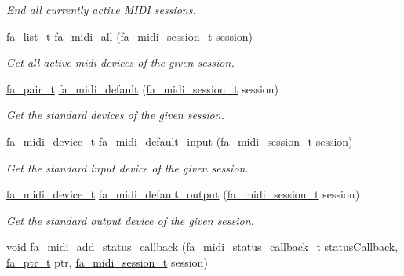 \begin{DoxyCompactItemize}
\begin{DoxyCompactList}\small\item\em End all currently active M\-I\-D\-I sessions. \end{DoxyCompactList}\item 
\hyperlink{group___fa_list_ga35ecb12ab934ded0cce0bcf28e3bc5d2}{fa\-\_\-list\-\_\-t} \hyperlink{group___fa_midi_gafbb8556093f979db2a0b3483e40c6da3}{fa\-\_\-midi\-\_\-all} (\hyperlink{group___fa_midi_ga222964548b932c6f53b575b23629530e}{fa\-\_\-midi\-\_\-session\-\_\-t} session)
\begin{DoxyCompactList}\small\item\em Get all active midi devices of the given session. \end{DoxyCompactList}\item 
\hyperlink{group___fa_pair_gac2b2e58c230bac4f8a63ef6c05072680}{fa\-\_\-pair\-\_\-t} \hyperlink{group___fa_midi_gab20056f966f2be60bd4be8279b74c893}{fa\-\_\-midi\-\_\-default} (\hyperlink{group___fa_midi_ga222964548b932c6f53b575b23629530e}{fa\-\_\-midi\-\_\-session\-\_\-t} session)
\begin{DoxyCompactList}\small\item\em Get the standard devices of the given session. \end{DoxyCompactList}\item 
\hyperlink{group___fa_midi_gabbbfd1ec30a186768ba2744e46bacc9b}{fa\-\_\-midi\-\_\-device\-\_\-t} \hyperlink{group___fa_midi_ga4e47ae817979dbce0da298466e97da75}{fa\-\_\-midi\-\_\-default\-\_\-input} (\hyperlink{group___fa_midi_ga222964548b932c6f53b575b23629530e}{fa\-\_\-midi\-\_\-session\-\_\-t} session)
\begin{DoxyCompactList}\small\item\em Get the standard input device of the given session. \end{DoxyCompactList}\item 
\hyperlink{group___fa_midi_gabbbfd1ec30a186768ba2744e46bacc9b}{fa\-\_\-midi\-\_\-device\-\_\-t} \hyperlink{group___fa_midi_gad859725831a5227e58a53e867af798b3}{fa\-\_\-midi\-\_\-default\-\_\-output} (\hyperlink{group___fa_midi_ga222964548b932c6f53b575b23629530e}{fa\-\_\-midi\-\_\-session\-\_\-t} session)
\begin{DoxyCompactList}\small\item\em Get the standard output device of the given session. \end{DoxyCompactList}\item 
void \hyperlink{group___fa_midi_ga448ae46b23a1271b7be8fb44ae88dbc9}{fa\-\_\-midi\-\_\-add\-\_\-status\-\_\-callback} (\hyperlink{group___fa_midi_gacc769aa23b097e8b8dc3d4807b9a066d}{fa\-\_\-midi\-\_\-status\-\_\-callback\-\_\-t} status\-Callback, \hyperlink{group___fa_ga915ddeae99ad7568b273d2b876425197}{fa\-\_\-ptr\-\_\-t} ptr, \hyperlink{group___fa_midi_ga222964548b932c6f53b575b23629530e}{fa\-\_\-midi\-\_\-session\-\_\-t} session)

\end{DoxyCompactItemize}
